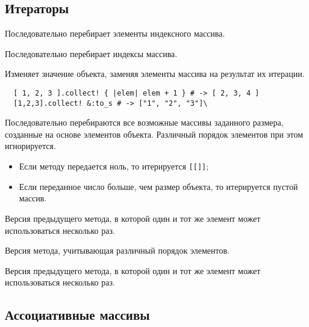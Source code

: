 \subsection*{Итераторы}

\begin{methodlist}
  Последовательно перебирает элементы индексного массива. 

  Последовательно перебирает индексы массива.

  Изменяет значение объекта, заменяя элементы массива на результат их итерации.
  \begin{verbatim}
  [ 1, 2, 3 ].collect! { |elem| elem + 1 } # -> [ 2, 3, 4 ]
  [1,2,3].collect! &:to_s # -> ["1", "2", "3"]\
  \end{verbatim}
  

  Последовательно перебираются все возможные массивы заданного размера, созданные на основе элементов объекта. Различный порядок элементов при этом игнорируется.
  \begin{itemize}
    \item Если методу передается ноль, то итерируется \verb![[]]!;
    \item Если переданное число больше, чем размер объекта, то итерируется пустой массив.
  \end{itemize}
  
  Версия предыдущего метода, в которой один и тот же элемент может использоваться несколько раз.

  Версия метода, учитывающая различный порядок элементов.

  Версия предыдущего метода, в которой один и тот же элемент может использоваться несколько раз. 
\end{methodlist}

\subsection*{Ассоциативные массивы}

